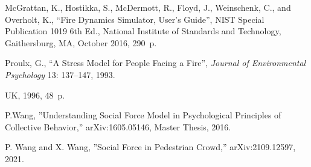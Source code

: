 \documentclass[english]{article}
\begin{document}
\begin{thebibliography}{References}
 McGrattan, K., Hostikka, S., McDermott, R.,
Floyd, J., Weinschenk, C., and Overholt, K., ``Fire Dynamics Simulator,
User's Guide'', NIST Special Publication 1019 6th Ed., National Institute
of Standards and Technology, Gaithersburg, MA, October 2016, 290~p. 

 Proulx, G., ``A Stress Model for People Facing
a Fire'', \emph{Journal of Environmental Psychology} 13: 137--147,
1993.

UK, 1996, 48~p. 

 P.Wang, ''Understanding Social Force Model in Psychological 
Principles of Collective Behavior,'' arXiv:1605.05146, Master Thesis, 2016.  

 P. Wang and X. Wang, ''Social Force in Pedestrian Crowd,'' arXiv:2109.12597, 2021.  

\end{thebibliography}
\end{document}
